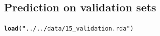 \documentclass{article}\usepackage[]{graphicx}\usepackage[]{color}
\makeatletter
\newcommand{\hlstr}[1]{\textcolor[rgb]{0.192,0.494,0.8}{#1}}%
\newcommand{\hlstd}[1]{\textcolor[rgb]{0.345,0.345,0.345}{#1}}%
\newcommand{\hlkwd}[1]{\textcolor[rgb]{0.737,0.353,0.396}{\textbf{#1}}}%
\newenvironment{kframe}{%
 \def\at@end@of@kframe{}%
 \ifinner\ifhmode%
  \def\at@end@of@kframe{\end{minipage}}%
  \begin{minipage}{\columnwidth}%
 \fi\fi%
 \def\FrameCommand##1{\hskip\@totalleftmargin \hskip-\fboxsep
 \colorbox{shadecolor}{##1}\hskip-\fboxsep
     \hskip-\linewidth \hskip-\@totalleftmargin \hskip\columnwidth}%
 \MakeFramed {\advance\hsize-\width
   \@totalleftmargin\z@ \linewidth\hsize
   \@setminipage}}%
 {\par\unskip\endMakeFramed%
 \at@end@of@kframe}
\newenvironment{knitrout}{}{} %
\makeatother
\begin{document}


\subsection{Prediction on validation sets}
\begin{knitrout}
\color{fgcolor}\begin{kframe}
\begin{alltt}
\hlkwd{load}\hlstd{(}\hlstr{"../../data/15_validation.rda"}\hlstd{)}
\end{alltt}
\end{kframe}
\end{knitrout}
\end{document}
